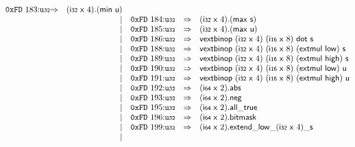 $$\begin{array}{@{}l@{}rrlll@{}l@{}}
\mathtt{0xFD}~183{:}{\mathtt{u{\scriptstyle32}}} &\Rightarrow& (\mathsf{i{\scriptstyle32}}~\mathsf{x}~4) . (\mathsf{min}~\mathsf{u}) \\ &&|&
\mathtt{0xFD}~184{:}{\mathtt{u{\scriptstyle32}}} &\Rightarrow& (\mathsf{i{\scriptstyle32}}~\mathsf{x}~4) . (\mathsf{max}~\mathsf{s}) \\ &&|&
\mathtt{0xFD}~185{:}{\mathtt{u{\scriptstyle32}}} &\Rightarrow& (\mathsf{i{\scriptstyle32}}~\mathsf{x}~4) . (\mathsf{max}~\mathsf{u}) \\ &&|&
\mathtt{0xFD}~186{:}{\mathtt{u{\scriptstyle32}}} &\Rightarrow& \mathsf{vextbinop}~(\mathsf{i{\scriptstyle32}}~\mathsf{x}~4)~(\mathsf{i{\scriptstyle16}}~\mathsf{x}~8)~\mathsf{dot}~\mathsf{s} \\ &&|&
\mathtt{0xFD}~188{:}{\mathtt{u{\scriptstyle32}}} &\Rightarrow& \mathsf{vextbinop}~(\mathsf{i{\scriptstyle32}}~\mathsf{x}~4)~(\mathsf{i{\scriptstyle16}}~\mathsf{x}~8)~(\mathsf{extmul}~\mathsf{low})~\mathsf{s} \\ &&|&
\mathtt{0xFD}~189{:}{\mathtt{u{\scriptstyle32}}} &\Rightarrow& \mathsf{vextbinop}~(\mathsf{i{\scriptstyle32}}~\mathsf{x}~4)~(\mathsf{i{\scriptstyle16}}~\mathsf{x}~8)~(\mathsf{extmul}~\mathsf{high})~\mathsf{s} \\ &&|&
\mathtt{0xFD}~190{:}{\mathtt{u{\scriptstyle32}}} &\Rightarrow& \mathsf{vextbinop}~(\mathsf{i{\scriptstyle32}}~\mathsf{x}~4)~(\mathsf{i{\scriptstyle16}}~\mathsf{x}~8)~(\mathsf{extmul}~\mathsf{low})~\mathsf{u} \\ &&|&
\mathtt{0xFD}~191{:}{\mathtt{u{\scriptstyle32}}} &\Rightarrow& \mathsf{vextbinop}~(\mathsf{i{\scriptstyle32}}~\mathsf{x}~4)~(\mathsf{i{\scriptstyle16}}~\mathsf{x}~8)~(\mathsf{extmul}~\mathsf{high})~\mathsf{u} \\ &&|&
\mathtt{0xFD}~192{:}{\mathtt{u{\scriptstyle32}}} &\Rightarrow& (\mathsf{i{\scriptstyle64}}~\mathsf{x}~2) . \mathsf{abs} \\ &&|&
\mathtt{0xFD}~193{:}{\mathtt{u{\scriptstyle32}}} &\Rightarrow& (\mathsf{i{\scriptstyle64}}~\mathsf{x}~2) . \mathsf{neg} \\ &&|&
\mathtt{0xFD}~195{:}{\mathtt{u{\scriptstyle32}}} &\Rightarrow& (\mathsf{i{\scriptstyle64}}~\mathsf{x}~2) . \mathsf{all\_true} \\ &&|&
\mathtt{0xFD}~196{:}{\mathtt{u{\scriptstyle32}}} &\Rightarrow& (\mathsf{i{\scriptstyle64}}~\mathsf{x}~2).\mathsf{bitmask} \\ &&|&
\mathtt{0xFD}~199{:}{\mathtt{u{\scriptstyle32}}} &\Rightarrow& (\mathsf{i{\scriptstyle64}}~\mathsf{x}~2) . {{{{{{\mathsf{extend}}{\mathsf{\_}}}{\mathsf{low}}}{\mathsf{\_}}}{(\mathsf{i{\scriptstyle32}}~\mathsf{x}~4)}}{\mathsf{\_}}}{\mathsf{s}} \\ &&|&

\end{array}$$
